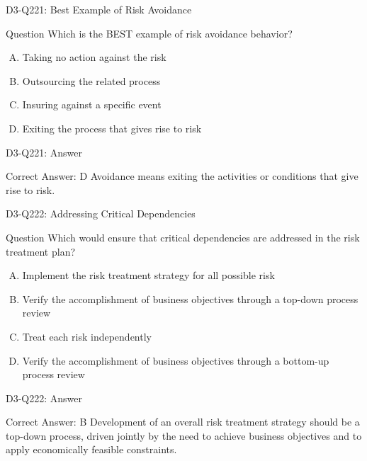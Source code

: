\documentclass{beamer}
\begin{document}
	\begin{frame}{D3-Q221: Best Example of Risk Avoidance}
		\begin{block}{Question}
			Which is the BEST example of risk avoidance behavior?
		\end{block}
		\begin{enumerate}[(A)]
			\item Taking no action against the risk
			\item Outsourcing the related process
			\item Insuring against a specific event
			\item Exiting the process that gives rise to risk
		\end{enumerate}
	\end{frame}
	\begin{frame}{D3-Q221: Answer}
		\begin{block}{Correct Answer: D}
			Avoidance means exiting the activities or conditions that give rise to risk.
		\end{block}
	\end{frame}
	
	\begin{frame}{D3-Q222: Addressing Critical Dependencies}
		\begin{block}{Question}
			Which would ensure that critical dependencies are addressed in the risk treatment plan?
		\end{block}
		\begin{enumerate}[(A)]
			\item Implement the risk treatment strategy for all possible risk
			\item Verify the accomplishment of business objectives through a top-down process review
			\item Treat each risk independently
			\item Verify the accomplishment of business objectives through a bottom-up process review
		\end{enumerate}
	\end{frame}
	\begin{frame}{D3-Q222: Answer}
		\begin{block}{Correct Answer: B}
			Development of an overall risk treatment strategy should be a top-down process, driven jointly by the need to achieve business objectives and to apply economically feasible constraints.
		\end{block}
	\end{frame}
	
\end{document}
